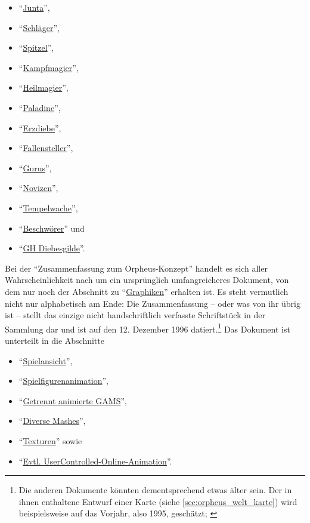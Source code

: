 \documentclass[a5paper,pagesize,numbers=noenddot]{scrbook}
\begin{document}
\begin{itemize}
   \item \enquote{\uline{Junta}},
   \item \enquote{\uline{Schläger}},
   \item \enquote{\uline{Spitzel}},
   \item \enquote{\uline{Kampfmagier}},
   \item \enquote{\uline{Heilmagier}},
   \item \enquote{\uline{Paladine}},
   \item \enquote{\uline{Erzdiebe}},
   \item \enquote{\uline{Fallensteller}},
   \item \enquote{\uline{Gurus}},
   \item \enquote{\uline{Novizen}},
   \item \enquote{\uline{Tempelwache}},
   \item \enquote{\uline{Beschwörer}} und
   \item \enquote{\uline{GH Diebesgilde}}.
\end{itemize}


Bei der \enquote{Zusammenfassung zum Orpheus-Konzept} handelt es sich aller Wahrscheinlichkeit nach um ein ursprünglich umfangreicheres Dokument, von dem nur noch der Abschnitt zu \enquote{\uline{Graphiken}} erhalten ist.\autocite[Vgl.][]{archive_orpheus_2024} %
Es steht vermutlich nicht nur alphabetisch am Ende:
Die Zusammenfassung -- oder was von ihr übrig ist -- stellt das einzige nicht handschriftlich verfasste Schriftstück in der Sammlung dar und ist auf den 12. Dezember 1996 datiert.\footnote{Die anderen Dokumente könnten dementsprechend etwas älter sein. Der in ihnen enthaltene Entwurf einer Karte (siehe \autoref{sec:orpheus_welt_karte}) wird beispielsweise auf das Vorjahr, also 1995, geschätzt; \autocite[vgl.][]{flosha_evolution_2024}}
Das Dokument ist unterteilt in die Abschnitte

\begin{itemize}
   \item \enquote{\uline{Spielansicht}},
   \item \enquote{\uline{Spielfigurenanimation}},
   \item \enquote{\uline{Getrennt animierte GAMS}},
   \item \enquote{\uline{Diverse Mashes}},
   \item \enquote{\uline{Texturen}} sowie
   \item \enquote{\uline{Evtl. User\-Controlled-Online-Animation}}.
\end{itemize}
\end{document}
